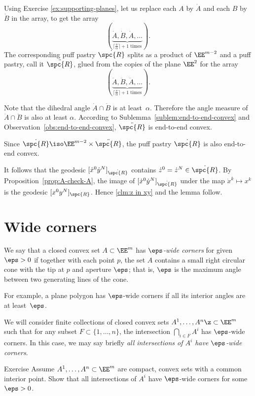 Using Exercise \ref{ex:supporting-planes}, let us replace each $A$ by $\dot A$ and each $B$ by $\dot B$
in the array, to get the array
\[(\underbrace{\dot A,\dot B,\dot A,\dots}_{\text{$\lceil\tfrac\pi\alpha\rceil+1$ times}}).\]
The corresponding puff pastry $\dot{\spc{R}}$
splits as a product of $\EE^{m-2}$ and a puff pastry, 
call it $\ddot{\spc{R}}$,
glued from the copies of the plane $\EE^2$ for the array
\[(\underbrace{\ddot A,\ddot B,\ddot A,\dots}_{\text{$\lceil\tfrac\pi\alpha\rceil+1$ times}}).\]

Note that the dihedral angle $\dot A\cap \dot B$ is at least~$\alpha$.
Therefore the angle measure of  $\ddot A\cap \ddot B$ is also at least $\alpha$.
According to Sublemma~\ref{sublem:end-to-end-convex} and Observation~\ref{obs:end-to-end-convex}, $\ddot{\spc{R}}$ is end-to-end convex.

Since $\dot{\spc{R}}\iso\EE^{m-2}\times\ddot{\spc{R}}$, 
the puff pastry $\dot{\spc{R}}$ is also end-to-end convex.

It follows that the geodesic $[\dot x^0\dot y^N]_{\dot{\spc{R}}}$ contains $\dot z^0=\dot z^N\in\dot{\spc{R}}$.
By Proposition~\ref{prop:A-check-A}, 
the image of $[\dot x^0\dot y^N]_{\dot{\spc{R}}}$ 
under the map $\dot x^k\mapsto x^k$
is the geodesic $[x^0 y^N]_{\spc{R}}$.
Hence \ref{clm:z in xy} and the lemma follow.
\qeds

\section{Wide corners}
\label{sec:wide-corners}

We say that a closed convex set $A\subset \EE^m$ has  \emph{$\eps$-wide corners}\label{page:wide corners} for given $\eps >0$ 
if together with each point $p$, 
the set $A$ contains a small right circular cone
with the tip at $p$ and aperture $\eps$;
that is, $\eps$ is the maximum angle between two generating lines of the cone.

For example, 
a plane polygon 
has $\eps$-wide corners
if all its interior angles are at least~$\eps$.

We will consider finite collections of closed convex sets 
$A^1,\dots,A^n\z\subset\EE^m$ 
such that for any subset $F\subset\{1,\dots,n\}$,
the intersection
$\bigcap_{i\in F}A^i$ 
has $\eps$-wide corners.
In this case, we may say briefly \textit{all intersections of $A^i$ have $\eps$-wide corners}.


\begin{thm}{Exercise}\label{ex:compact-walls}
Assume $A^1,\dots,A^n\subset\EE^m$ are compact, convex sets with a common interior point.
Show that all intersections of $A^i$ have $\eps$-wide corners for some~$\eps>0$.
\end{thm}


